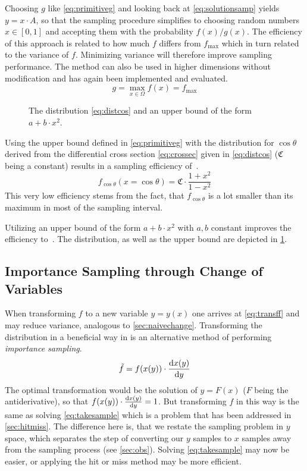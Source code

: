 Choosing \(g\) like \cref{eq:primitiveg} and looking back at
\cref{eq:solutionsamp} yields \(y = x\cdot A\), so that the sampling
procedure simplifies to choosing random numbers \(x\in [0,1]\) and
accepting them with the probability \(f(x)/g(x)\). The efficiency of
this approach is related to how much \(f\) differs from
\(f_{\text{max}}\) which in turn related to the variance of
\(f\). Minimizing variance will therefore improve sampling
performance. The method can also be used in higher dimensions without
modification and has again been implemented and evaluated.
%
\begin{equation}
  \label{eq:primitiveg}
  g=\max_{x\in\Omega}f(x)=f_{\text{max}}
\end{equation}
%
\begin{figure}[ht]
  \centering
  \caption{\label{fig:distcos} The distribution \cref{eq:distcos} and an upper bound of
    the form \(a + b\cdot x^2\).}
\end{figure}
%
Using the upper bound defined in \cref{eq:primitiveg} with the
distribution for \(\cos\theta\) derived from the differential cross
section \cref{eq:crossec} given in \cref{eq:distcos}
(\(\mathfrak{C}\) being a constant) results in a sampling efficiency
of~.
%
\begin{equation}
  \label{eq:distcos}
  f_{\cos\theta}(x=\cos\theta) = \mathfrak{C}\cdot\frac{1+x^2}{1-x^2}
\end{equation}
%
This very low efficiency stems from the fact, that \(f_{\cos\theta}\)
is a lot smaller than its maximum in most of the sampling interval.

Utilizing an upper bound of the form \(a + b\cdot x^2\) with \(a, b\)
constant improves the efficiency
to~. The distribution, as well as the
upper bound are depicted in \cref{fig:distcos}.

\subsection{Importance Sampling through Change of Variables}%
\label{sec:importsamp}

When transforming \(f\) to a new variable \(y=y(x)\) one arrives at
\cref{eq:transff} and may reduce variance, analogous to
\cref{sec:naivechange}. Transforming the distribution in a beneficial
way in is an alternative method of performing \emph{importance
  sampling}.
%
\begin{equation}
  \label{eq:transff}
  \tilde{f} = f(x(y)) \cdot \dv{x(y)}{y}
\end{equation}
%
The optimal transformation would be the solution of \(y = F(x)\)
(\(F\) being the antiderivative), so that
\(f(x(y)) \cdot \dv{x(y)}{y} = 1\). But transforming \(f\) in this way
is the same as solving \cref{eq:takesample} which is a problem that
has been addressed in \cref{sec:hitmiss}. The difference here is, that
we restate the sampling problem in \(y\) space, which separates the
step of converting our \(y\) samples to \(x\) samples away from the
sampling process (see \cref{sec:obs}). Solving \cref{eq:takesample}
may now be easier, or applying the hit or miss method may be more
efficient.

